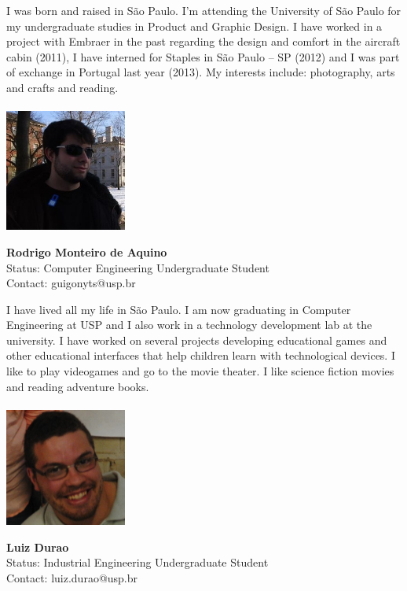 I was born and raised in S\~{a}o Paulo. I'm attending the University of S\~{a}o Paulo for my undergraduate studies in Product and Graphic Design. I have worked in a project with Embraer in the past regarding the design and comfort in the aircraft cabin (2011), I have interned for Staples in S\~{a}o Paulo – SP (2012) and I was part of exchange in Portugal last year (2013). My interests include: photography, arts and crafts and reading.
\\ \\

\noindent \includegraphics[width=40mm]{images/image014}
\parbox[b]{0.6\textwidth}{\textbf{Rodrigo Monteiro de Aquino}\\
Status: Computer Engineering Undergraduate Student \\
Contact: guigonyts@usp.br \\
}

I have lived all my life in S\~{a}o Paulo. I am now graduating in Computer Engineering at USP and I also work in a technology development lab at the university. I have worked on several projects developing educational games and other educational interfaces that help children learn with technological devices.  I like to play videogames and go to the movie theater. I like science fiction movies and reading adventure books.
\\ \\

\noindent \includegraphics[width=40mm]{images/image015}
\parbox[b]{0.6\textwidth}{\textbf{Luiz Durao}\\
Status: Industrial Engineering Undergraduate Student \\
Contact: luiz.durao@usp.br  \\
}

